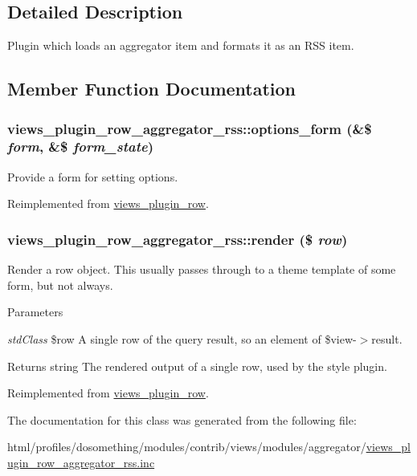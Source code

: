\subsection{Detailed Description}
Plugin which loads an aggregator item and formats it as an RSS item. 

\subsection{Member Function Documentation}
\hypertarget{classviews__plugin__row__aggregator__rss_aa5c9bce3143901863f1a446b622fda9c}{
\subsubsection[{options\_\-form}]{\setlength{\rightskip}{0pt plus 5cm}views\_\-plugin\_\-row\_\-aggregator\_\-rss::options\_\-form (\&\$ {\em form}, \/  \&\$ {\em form\_\-state})}}
\label{classviews__plugin__row__aggregator__rss_aa5c9bce3143901863f1a446b622fda9c}
Provide a form for setting options. 

Reimplemented from \hyperlink{classviews__plugin__row_a6914c39d64977a0aa71da39cc1af004e}{views\_\-plugin\_\-row}.\hypertarget{classviews__plugin__row__aggregator__rss_add4aa0892bf305556bb9a04c62da6027}{
\subsubsection[{render}]{\setlength{\rightskip}{0pt plus 5cm}views\_\-plugin\_\-row\_\-aggregator\_\-rss::render (\$ {\em row})}}
\label{classviews__plugin__row__aggregator__rss_add4aa0892bf305556bb9a04c62da6027}
Render a row object. This usually passes through to a theme template of some form, but not always.


\begin{DoxyParams}{Parameters}
\item[{\em stdClass}]\$row A single row of the query result, so an element of \$view-\/$>$result.\end{DoxyParams}
\begin{DoxyReturn}{Returns}
string The rendered output of a single row, used by the style plugin. 
\end{DoxyReturn}


Reimplemented from \hyperlink{classviews__plugin__row_a8243842e087dd28664b32cef0309f2a6}{views\_\-plugin\_\-row}.

The documentation for this class was generated from the following file:\begin{DoxyCompactItemize}
\item 
html/profiles/dosomething/modules/contrib/views/modules/aggregator/\hyperlink{views__plugin__row__aggregator__rss_8inc}{views\_\-plugin\_\-row\_\-aggregator\_\-rss.inc}\end{DoxyCompactItemize}
